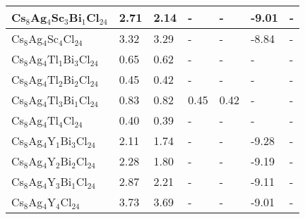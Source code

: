 \documentclass[journal=jpclcd,manuscript=letter]{achemso}
\begin{document}
\begin{table}
\begin{tabular}{p{3.8cm} p{1.2cm}p{1.2cm}p{1.2cm}p{1.2cm}p{2.2cm}p{2.4cm}}
	Cs$_8$Ag$_4$Sc$_{3}$Bi$_{1}$Cl$_{24}$&2.71&2.14&-&-& -9.01&-\\ \hline
	Cs$_8$Ag$_4$Sc$_{4}$Cl$_{24}$&3.32&3.29&-&-& -8.84&- \\ \hline
	Cs$_8$Ag$_4$Tl$_{1}$Bi$_{3}$Cl$_{24}$&0.65&0.62&-&-&-&-\\ \hline
	Cs$_8$Ag$_4$Tl$_{2}$Bi$_{2}$Cl$_{24}$&0.45&0.42&-&-&-&-\\ \hline
	Cs$_8$Ag$_4$Tl$_{3}$Bi$_{1}$Cl$_{24}$&0.83&0.82&0.45&0.42&-&-\\ \hline			
	Cs$_8$Ag$_4$Tl$_{4}$Cl$_{24}$&0.40&0.39&-&-&-&-\\ \hline
	Cs$_8$Ag$_4$Y$_{1}$Bi$_{3}$Cl$_{24}$&2.11&1.74&-&-& -9.28&-\\ \hline			
	Cs$_8$Ag$_4$Y$_{2}$Bi$_{2}$Cl$_{24}$&2.28&1.80&-&-&-9.19&-\\ \hline				
	Cs$_8$Ag$_4$Y$_{3}$Bi$_{1}$Cl$_{24}$&2.87&2.21&-&-& -9.11&-\\ \hline
	Cs$_8$Ag$_4$Y$_{4}$Cl$_{24}$&3.73&3.69&-&-&-9.01&-\\ \hline
	
\end{tabular}
\label{Table1}
\end{table}	
\newpage
\end{document}
